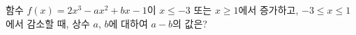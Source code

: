 함수 $f(x)=2x^3-ax^2+bx-1$이 $x\le -3$ 또는 $x\ge 1$에서 증가하고, $-3\le x\le 1$에서 감소할 때, 상수 $a$, $b$에 대하여 $a-b$의 값은?
